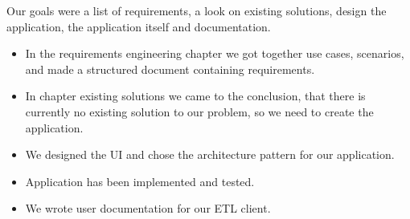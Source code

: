Our goals were a list of requirements, a look on existing solutions, design the application, the application itself and documentation.

\begin{itemize}
    \item In the requirements engineering chapter we got together use cases, scenarios, and made a structured document containing requirements.
    \item In chapter existing solutions we came to the conclusion, that there is currently no existing solution to our problem, so we need to create the application.
    \item We designed the UI and chose the architecture pattern for our application.
    \item Application has been implemented and tested.
    \item We wrote user documentation for our ETL client.
\end{itemize}